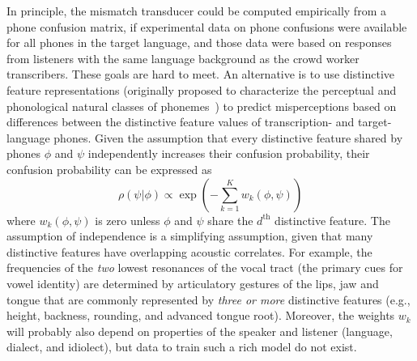 In principle, the mismatch transducer could be computed empirically from
a phone confusion matrix, if experimental data on phone confusions
were available for all phones in the target language, and those data
were based on responses from listeners with the same language background
as the crowd worker transcribers. These goals are hard to meet. 
An alternative is to use distinctive feature representations
(originally proposed to characterize the perceptual and phonological
natural classes of phonemes~\cite{Jakobson52}) to predict misperceptions
based on differences between the distinctive feature values of 
transcription- and target-language phones. Given the assumption that 
every distinctive feature shared by phones $\phi$ and $\psi$ 
independently increases their confusion probability, their confusion 
probability can be expressed as
\begin{equation}
  \rho(\psi|\phi)\propto \exp\left(-\sum_{k=1}^K
  w_k(\phi,\psi)\right)
  \label{eq:dfdist}
\end{equation}
where $w_k(\phi,\psi)$ is
zero unless $\phi$ and $\psi$ share the $d^{\textrm{th}}$ distinctive
feature. The assumption of independence is a simplifying assumption,
given that many distinctive features have overlapping acoustic
correlates. For example, the frequencies of the {\em two} lowest
resonances of the vocal tract (the primary cues for vowel identity) are
determined by articulatory gestures of the lips, jaw and tongue that are
commonly represented by {\em three or more} distinctive features
(e.g., height, backness, rounding, and advanced tongue root). Moreover,
the weights $w_k$ will probably also depend on properties of the speaker
and listener (language, dialect, and idiolect), but data to train such a
rich model do not exist.

